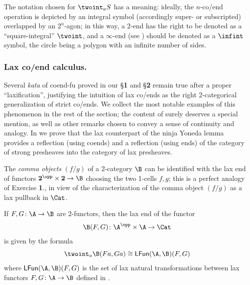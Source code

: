 \begin{remark}
The notation chosen for $\twoint_a S$ has a meaning: ideally, the $n$-co/end operation is depicted by an integral symbol (accordingly super- or subscripted) overlapped by an $2^n$-agon; in this way, a 2-end has the right to be denoted as a ``square-integral'' $\twoint$, and a $\infty$-end (see \adef{}) should be denoted as a $\infint$ symbol, the circle being a polygon with an infinite number of sides.
\end{remark}
\subsubsection{\bf Lax co/end calculus.}
Several \emph{kata} of coend-fu proved in our \S\textbf{1} and \S\textbf{2} remain true after a proper ``laxification'', justifying the intuition of lax co/ends as the right 2-categorical generalization of strict co/ends. We collect the most notable examples of this phenomenon in the rest of the section; the content of  surely deserves a special mention, as well as other remarks chosen to convey a sense of continuity and analogy. In  we prove that the lax counterpart of the ninja Yoneda lemma  provides a reflection (using coends) and a reflection (using ends) of the category of strong presheaves into the category of lax presheaves.
\begin{example}\label{commaobj}
The \emph{comma objects} $(f/g)$ \cite{Gray} of a 2-category $\B$ can be identified with the lax end of functors $\mathbf{2}^\opp\times\mathbf{2}\to \B$ choosing the two 1-cells $f,g$; this is a perfect analogy of Exercise \textbf{1}., in view of the characterization of the comma object $(f/g)$ as a lax pullback in $\Cat$.
\end{example}
\begin{example}\label{laxnat}
If $F,G\colon \A\to \B$ are 2-functors, then the lax end of the functor
\[
\B(F,G)\colon \A^\opp\times \A\to \Cat
\]
is given by the formula
\[
\twoint_a \B(Fa,Ga)\cong \textsf{LFun}(\A, \B)(F,G)
\]
where $\textsf{LFun}(\A, \B)(F,G)$ is the set of lax natural transformations between lax functors $F,G\colon \A\to \B$ defined in \cite{Gray}.
\end{example}
